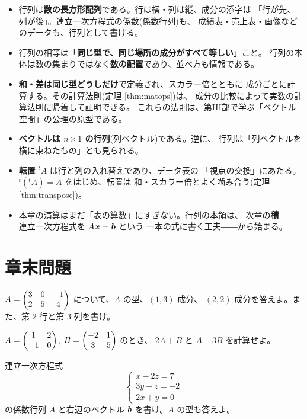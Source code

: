 \begin{matome}
\begin{itemize}
\item 行列は\textbf{数の長方形配列}である。行は横・列は縦、成分の添字は
「行が先、列が後」。連立一次方程式の係数(係数行列)も、
成績表・売上表・画像などのデータも、行列として書ける。
\item 行列の相等は「\textbf{同じ型で、同じ場所の成分がすべて等しい}」こと。
行列の本体は数の集まりではなく\textbf{数の配置}であり、並べ方も情報である。
\item \textbf{和・差は同じ型どうしだけ}で定義され、スカラー倍とともに
成分ごとに計算する。その計算法則(定理 \ref{thm:matops})は、
成分の比較によって実数の計算法則に帰着して証明できる。
これらの法則は、第III部で学ぶ「ベクトル空間」の公理の原型である。
\item \textbf{ベクトルは $n \times 1$ の行列}(列ベクトル)である。逆に、
行列は「列ベクトルを横に束ねたもの」とも見られる。
\item \textbf{転置} ${}^t\!A$ は行と列の入れ替えであり、データ表の
「視点の交換」にあたる。${}^t({}^t\!A) = A$ をはじめ、転置は
和・スカラー倍とよく噛み合う(定理 \ref{thm:transpose})。
\item 本章の演算はまだ「表の算数」にすぎない。行列の本領は、
次章の\textbf{積}――連立一次方程式を $A\bm{x} = \bm{b}$ という
一本の式に書く工夫――から始まる。
\end{itemize}
\end{matome}

\section*{章末問題}

\begin{mondai}[基本]\label{q:mat-ex1}
$A = \begin{pmatrix}3 & 0 & -1 \\ 2 & 5 & 4\end{pmatrix}$ について、$A$ の型、$(1,3)$ 成分、
$(2,2)$ 成分を答えよ。また、第 $2$ 行と第 $3$ 列を書け。
\end{mondai}

\begin{mondai}[基本]\label{q:mat-ex2}
$A = \begin{pmatrix}1 & 2 \\ -1 & 0\end{pmatrix}$, $B = \begin{pmatrix}-2 & 1 \\ 3 & 5\end{pmatrix}$ のとき、
$2A + B$ と $A - 3B$ を計算せよ。
\end{mondai}

\begin{mondai}[基本]\label{q:mat-ex3}
連立一次方程式
\[
\begin{cases}
x - 2z = 7 \\
3y + z = -2 \\
2x + y = 0
\end{cases}
\]
の係数行列 $A$ と右辺のベクトル $\bm{b}$ を書け。$A$ の型も答えよ。
\end{mondai}

